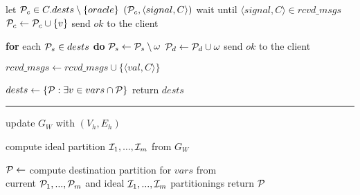 \begin{algorithm}[t!]
\begin{distribalgo}[1]
		\STATE let $\mathcal{P}_c \in C.dests \setminus \{oracle\}$
		\STATE \rmcast$(\mathcal{P}_c, \langle signal, C \rangle )$
		\STATE wait until $\langle signal, C \rangle \in rcvd\_msgs$
		\STATE $\mathcal{P}_c \leftarrow \mathcal{P}_c \cup      \{v\}$
                \STATE send $ok$ to the client
	\ENDINDENT

	\vspace{1.0mm}
                \STATE \textbf{for} each $\mathcal{P}_s \in dests$ \textbf{do} $\mathcal{P}_s \leftarrow \mathcal{P}_s \setminus \omega$
                \STATE $\mathcal{P}_d \leftarrow \mathcal{P}_d \cup \omega$
                \STATE send $ok$ to the client
	\ENDINDENT

        \vspace{1.0mm}
    
		\STATE $rcvd\_msgs \leftarrow rcvd\_msgs \cup \{\langle val, C \rangle\}$
	\ENDINDENT
	
	\vspace{1.0mm}
		\STATE $dests \leftarrow \{ \mathcal{P} : \exists v \in vars \cap \mathcal{P} \}$
		\STATE return $dests$
	\ENDINDENT
	
	\rule{83mm}{0.4pt}

		\STATE update $G_W$ with $(V_h,E_h)$
	\ENDINDENT
	
	\vspace{1.0mm}
    
		\STATE compute ideal partition $\mathcal{I}_1, ..., \mathcal{I}_m$ from $G_W$
	\ENDINDENT
	
	\vspace{1.0mm}
    
		\STATE $\mathcal{P} \leftarrow$ compute destination partition for $vars$ from\\ \hspace{8mm}current $\mathcal{P}_1, ..., \mathcal{P}_m$ and ideal $\mathcal{I}_1, ..., \mathcal{I}_m$ partitionings
		\STATE return $\mathcal{P}$
	\ENDINDENT	
	

\end{distribalgo}
\end{algorithm}
